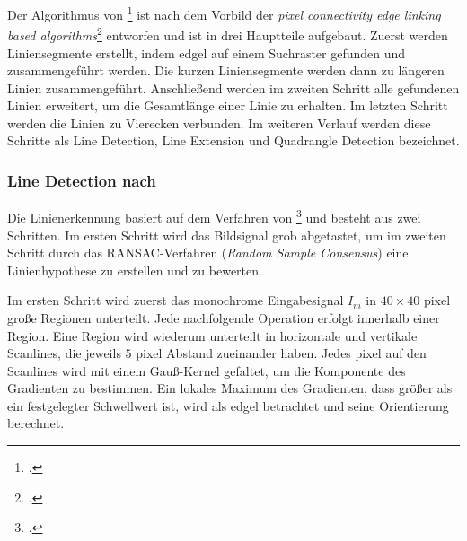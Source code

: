 Der Algorithmus von \citeauthor{hirzer08}\footcite{hirzer08} ist nach dem Vorbild der \textit{pixel connectivity edge
 linking based algorithms}\footcite[Vgl.][S.~5]{hirzer08} entworfen und ist in drei Hauptteile aufgebaut. Zuerst werden
 Liniensegmente erstellt, indem \gls{edgel} auf einem Suchraster gefunden und zusammengeführt werden. Die kurzen
 Liniensegmente werden dann zu längeren Linien zusammengeführt. Anschließend werden im zweiten Schritt alle gefundenen
 Linien erweitert, um die Gesamtlänge einer Linie zu erhalten. Im letzten Schritt werden die Linien zu Vierecken
 verbunden. Im weiteren Verlauf werden diese Schritte als Line Detection, Line Extension und Quadrangle Detection
 bezeichnet.

\subsubsection{Line Detection nach \texorpdfstring{\citeauthor{clarke96}}{Clarke, Carlsson und Zisserman}} %
\label{sub:line_detection_clarke}
Die Linienerkennung basiert auf dem Verfahren von \citeauthor{clarke96}\footcite{clarke96} und besteht aus zwei
 Schritten. Im ersten Schritt wird das Bildsignal grob abgetastet, um im zweiten Schritt durch das RANSAC-Verfahren
 (\textit{Random Sample Consensus}) eine Linienhypothese zu erstellen und zu bewerten.

Im ersten Schritt wird zuerst das monochrome Eingabesignal $I_m$ in $40 \times 40$ \gls{pixel} große Regionen
 unterteilt. Jede nachfolgende Operation erfolgt innerhalb einer Region. Eine Region wird wiederum unterteilt in
 horizontale und vertikale Scanlines, die jeweils $5$ \gls{pixel} Abstand zueinander haben. Jedes \gls{pixel} auf den
 Scanlines wird mit einem Gauß-Kernel gefaltet, um die Komponente des Gradienten zu bestimmen. Ein lokales Maximum des
 Gradienten, dass größer als ein festgelegter Schwellwert ist, wird als \gls{edgel} betrachtet und seine Orientierung
 berechnet.

